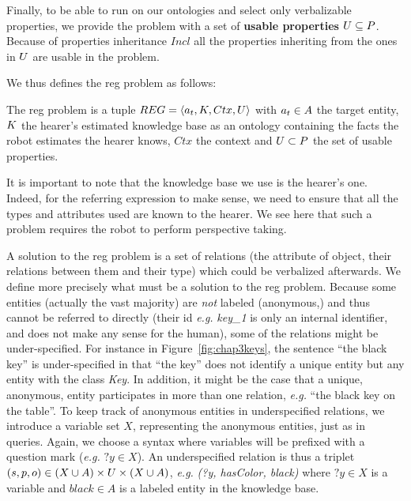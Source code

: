 \documentclass[a4paper,11pt,twoside]{StyleThese}
\begin{document}
Finally, to be able to run on our ontologies and select only verbalizable properties, we provide the problem with a set of \textbf{usable properties} $U \subseteq P$. Because of properties inheritance $Incl$ all the properties inheriting from the ones in $U$ are usable in the problem.

We thus defines the \acrshort{reg} problem as follows:
\begin{definition}
The \acrfull{reg} problem is a tuple $REG = \langle a_t, K, Ctx, U \rangle$ with $a_t \in A$ the target entity, $K$ the hearer's estimated knowledge base as an ontology containing the facts the robot estimates the hearer knows, $Ctx$ the context and $U \subset P$ the set of usable properties.
\end{definition}
It is important to note that the knowledge base we use is the hearer's one. Indeed, for the referring expression to make sense, we need to ensure that all the types and attributes used are known to the hearer. We see here that such a problem requires the robot to perform perspective taking.

A solution to the \acrshort{reg} problem is a set of relations (the attribute of object, their relations between them and their type) which could be verbalized afterwards. We define more precisely what must be a solution to the \acrshort{reg} problem.
Because some entities (actually the vast majority) are \textit{not} labeled (anonymous,) and thus cannot be referred to directly (their id \textit{e.g.} \textit{key\_1} is only an internal identifier, and does not make any sense for the human), some of the relations might be under-specified. For instance in Figure~\ref{fig:chap3keys}, the sentence ``the black key'' is under-specified in that ``the key'' does not identify a unique entity but any entity with the class \textit{Key}.
In addition, it might be the case that a unique, anonymous, entity participates in more than one relation, \textit{e.g.} ``the black key on the table''. 
To keep track of anonymous entities in underspecified relations, we introduce a variable set $X$, representing the anonymous entities, just as in \sparql{} queries. Again, we choose a syntax where variables will be prefixed with a question mark (\textit{e.g.} $?y \in X$).
An underspecified relation is thus a triplet $(s, p, o) \in (X \cup A) \times U \times (X \cup A)$, \textit{e.g.} \textit{(?y, hasColor, black)} where $?y \in X$ is a variable and $black \in A$ is a labeled entity in the knowledge base.
\end{document}
